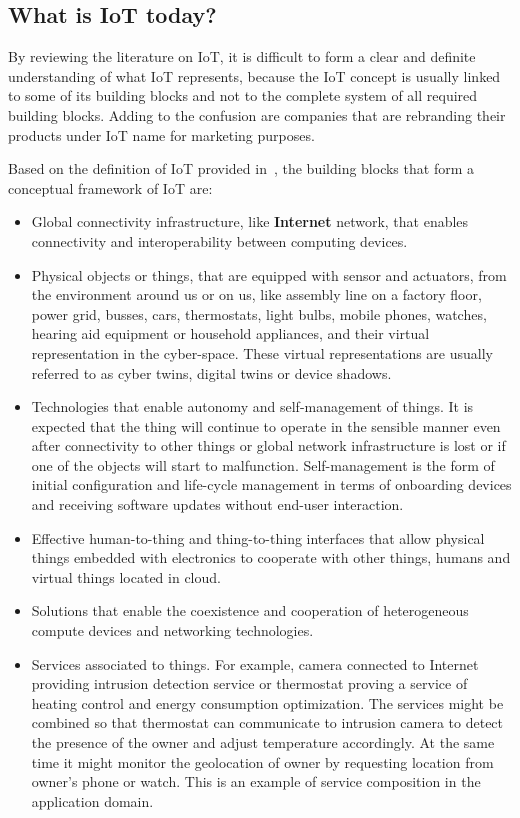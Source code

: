 \documentclass[english, 12pt, a4paper, elec, utf8, online]{aaltothesis}
\begin{document}
\subsection{What is IoT today?}
By reviewing the literature on IoT, it is difficult to form a clear and definite understanding of what IoT represents, because the IoT concept is usually linked to some of its building blocks and not to the complete system of all required building blocks. Adding to the confusion are companies that are rebranding their products under IoT name for marketing purposes.~\cite{AtzoriIM17}

Based on the definition of IoT provided in~\cite{AtzoriIM17}, the building blocks that form a conceptual framework of IoT are:
\begin{itemize}
\item
Global connectivity infrastructure, like \textbf{Internet} network, that enables connectivity and interoperability between computing devices.
\item
Physical objects or things, that are equipped with sensor and actuators, from the environment around us or on us, like assembly line on a factory floor, power grid, busses, cars, thermostats, light bulbs, mobile phones, watches, hearing aid equipment or household appliances, and their virtual representation in the cyber-space. These virtual representations are usually referred to as cyber twins, digital twins or device shadows. 
\item
Technologies that enable autonomy and self-management of things. It is expected that the thing will continue to operate in the sensible manner even after connectivity to other things or global network infrastructure is lost or if one of the objects will start to malfunction. Self-management is the form of initial configuration and life-cycle management in terms of onboarding devices and receiving software updates without end-user interaction.
\item
Effective human-to-thing and thing-to-thing interfaces that allow physical things embedded with electronics to cooperate with other things, humans and virtual things located in cloud.  
\item
Solutions that enable the coexistence and cooperation of heterogeneous compute devices and networking technologies.
\item
Services associated to things. For example, camera connected to Internet providing intrusion detection service or thermostat proving a service of heating control and energy consumption optimization. The services might be combined so that thermostat can communicate to intrusion camera to detect the presence of the owner and adjust temperature accordingly. At the same time it might monitor the geolocation of owner by requesting location from owner's phone or watch. This is an example of service composition in the application domain. 
\end{itemize}
\end{document}
